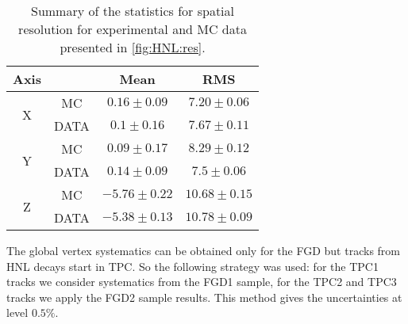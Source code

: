 \documentclass[../main.tex]{subfiles}
\begin{document}
\begin{table}[!ht]
\begin{center}
\begin{tabular}{|c|c|c|c|}
    \hline
    Axis & & Mean & RMS \\
    \hline
    \multirow{2}{*}{X} & MC & $0.16 \pm 0.09$ & $7.20\pm0.06$\\

    & DATA & $0.1\pm0.16$ & $7.67\pm0.11$ \\
    \hline
    \multirow{2}{*}{Y} & MC & $0.09 \pm 0.17$ & $8.29 \pm 0.12$\\

    & DATA & $0.14 \pm 0.09$ & $7.5 \pm 0.06$ \\
    \hline
    \multirow{2}{*}{Z} & MC & $-5.76 \pm 0.22$ & $10.68 \pm 0.15$\\

    & DATA & $-5.38 \pm 0.13$ & $10.78 \pm 0.09$ \\
    \hline
\end{tabular}
\caption{Summary of the statistics for spatial resolution for experimental and MC data presented in \autoref{fig:HNL:res}.}
\label{tbl:HNL:res}
\end{center}
\end{table}

The global vertex systematics can be obtained only for the FGD but tracks from HNL decays start in TPC. So the following strategy was used: for the TPC1 tracks we consider systematics from the FGD1 sample, for the TPC2 and TPC3 tracks we apply the FGD2 sample results. This method gives the uncertainties at level $0.5\%$.
\end{document}
